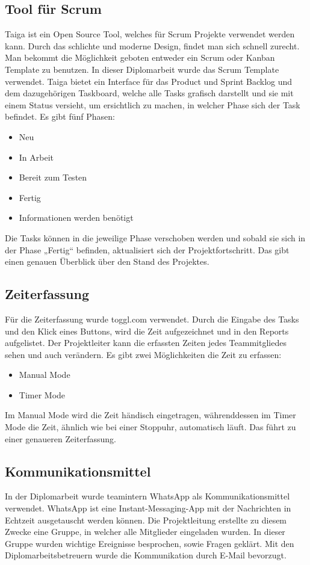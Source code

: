 \subsection{Tool für Scrum}
Taiga ist ein Open Source Tool, welches für Scrum Projekte verwendet werden kann. Durch das schlichte und moderne Design, findet man sich schnell zurecht. Man bekommt die Möglichkeit geboten entweder ein Scrum oder Kanban Template zu benutzen. In dieser Diplomarbeit wurde das Scrum Template verwendet. Taiga bietet ein Interface für das Product und Sprint Backlog und dem dazugehörigen Taskboard, welche alle Tasks grafisch darstellt und sie mit einem Status versieht, um ersichtlich zu machen, in welcher Phase sich der Task befindet. Es gibt fünf Phasen: 
\begin{itemize}
\item Neu
\item In Arbeit
\item Bereit zum Testen
\item Fertig
\item Informationen werden benötigt
\end{itemize}
Die Tasks können in die jeweilige Phase verschoben werden und sobald sie sich in der Phase „Fertig“ befinden, aktualisiert sich der Projektfortschritt. Das gibt einen genauen Überblick über den Stand des Projektes. 

\subsection{Zeiterfassung}
Für die Zeiterfassung wurde toggl.com verwendet. Durch die Eingabe des Tasks und den Klick eines Buttons, wird die Zeit aufgezeichnet und in den Reports aufgelistet. Der Projektleiter kann die erfassten Zeiten jedes Teammitgliedes sehen und auch verändern. Es gibt zwei Möglichkeiten die Zeit zu erfassen:
\begin{itemize}
\item Manual Mode
\item Timer Mode
\end{itemize}
Im Manual Mode wird die Zeit händisch eingetragen, währenddessen im Timer Mode die Zeit, ähnlich wie bei einer Stoppuhr, automatisch läuft. Das führt zu einer genaueren Zeiterfassung. 

\subsection{Kommunikationsmittel}
In der Diplomarbeit wurde teamintern WhatsApp als Kommunikationsmittel verwendet. WhatsApp ist eine Instant-Messaging-App mit der Nachrichten in Echtzeit ausgetauscht werden können. Die Projektleitung erstellte zu diesem Zwecke eine Gruppe, in welcher alle Mitglieder eingeladen wurden. In dieser Gruppe wurden wichtige Ereignisse besprochen, sowie Fragen geklärt. 
Mit den Diplomarbeitsbetreuern wurde die Kommunikation durch E-Mail bevorzugt. 

